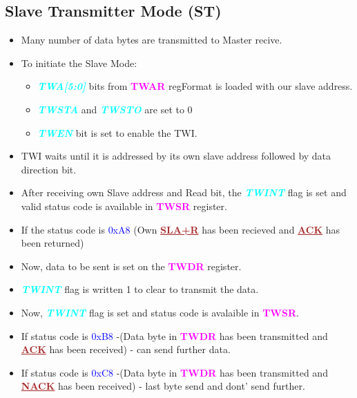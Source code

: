 \documentclass{article}
\newcommand{\bitFormat}[1]{\emph{\textbf{\textcolor{cyan}{#1}}}}
\newcommand{\regFormat}[1]{\textbf{\textcolor{magenta}{#1}}}
\newcommand{\iicFormat}[1]{\textbf{\textcolor{brown}{\underline{#1}}}}
\newcommand{\statusCode}[1]{{\textcolor{blue}{{ \LARGE #1}}}}
\begin{document}
\subsection{Slave Transmitter Mode (ST)}
\begin{itemize}
    \item Many number of data bytes are transmitted to Master recive.
    \item To initiate the Slave Mode:
    \begin{itemize}
        \item \bitFormat{TWA[5:0]} bits from \regFormat{TWAR} regFormat is loaded with our slave address.
        \item \bitFormat{TWSTA} and \bitFormat{TWSTO} are set to 0
        \item \bitFormat{TWEN} bit is set to enable the TWI.
    \end{itemize}
    \item TWI waits until it is addressed by its own slave address followed by data direction bit.
    \item After receiving own Slave address and Read bit, the \bitFormat{TWINT} flag is set and valid status code is available in \regFormat{TWSR} register.
    \item If the status code is \statusCode{0xA8} (Own \iicFormat{SLA+R} has been recieved and \iicFormat{ACK} has been returned)
    \item Now, data to be sent is set on the \regFormat{TWDR} register.
    \item \bitFormat{TWINT} flag is written 1 to clear to transmit the data.
    \item Now, \bitFormat{TWINT} flag is set and status code is avalaible in \regFormat{TWSR}.
    \item If status code is \statusCode{0xB8} -(Data byte in \regFormat{TWDR} has been transmitted and \iicFormat{ACK} has been received) - can send further data.
    \item If status code is \statusCode{0xC8} -(Data byte in \regFormat{TWDR} has been transmitted and \iicFormat{NACK} has been received) - last byte send and dont' send further.
\end{itemize}
\end{document}
